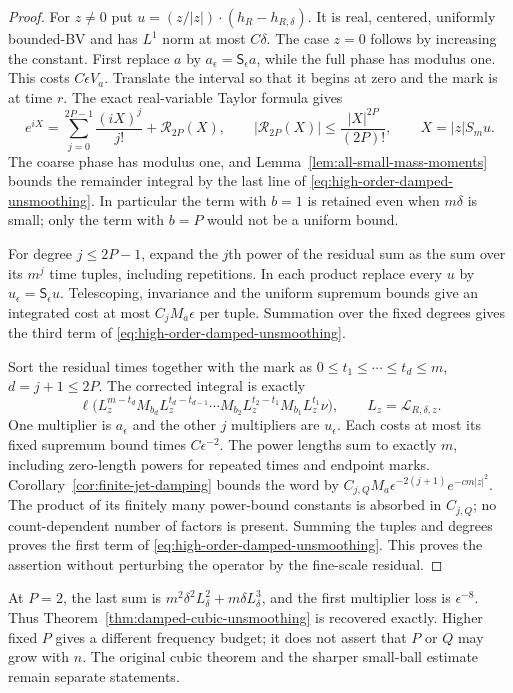 \begin{proof}
For $z\ne0$ put $u=(z/|z|)\cdot(h_R-h_{R,\delta})$. It is real,
centered, uniformly bounded-BV and has $L^1$ norm at most $C\delta$.
The case $z=0$ follows by increasing the constant. First replace
$a$ by $a_\epsilon=\mathsf S_\epsilon a$, while the full phase has
modulus one. This costs $C\epsilon V_a$. Translate the interval so
that it begins at zero and the mark is at time $r$. The exact
real-variable Taylor formula gives
\[
 e^{iX}=\sum_{j=0}^{2P-1}\frac{(iX)^j}{j!}+\mathcal R_{2P}(X),
 \qquad |\mathcal R_{2P}(X)|\le\frac{|X|^{2P}}{(2P)!},
 \qquad X=|z|S_m u.
\]
The coarse phase has modulus one, and
Lemma~\ref{lem:all-small-mass-moments} bounds the remainder integral
by the last line of \eqref{eq:high-order-damped-unsmoothing}.
In particular the term with $b=1$ is retained even when $m\delta$
is small; only the term with $b=P$ would not be a uniform bound.

For degree $j\le2P-1$, expand the $j$th power of the residual sum
as the sum over its $m^j$ time tuples, including repetitions. In each
product replace every $u$ by $u_\epsilon=\mathsf S_\epsilon u$.
Telescoping, invariance and the uniform supremum bounds give an
integrated cost at most $C_jM_a\epsilon$ per tuple. Summation over
the fixed degrees gives the third term of
\eqref{eq:high-order-damped-unsmoothing}.

Sort the residual times together with the mark as
$0\le t_1\le\cdots\le t_d\le m$, $d=j+1\le2P$. The corrected
integral is exactly
\[
 \ell\bigl(L_z^{m-t_d}M_{b_d}L_z^{t_d-t_{d-1}}
  \cdots M_{b_2}L_z^{t_2-t_1}M_{b_1}L_z^{t_1}\nu\bigr),
 \qquad L_z=\mathcal L_{R,\delta,z}.
\]
One multiplier is $a_\epsilon$ and the other $j$ multipliers are
$u_\epsilon$. Each costs at most its fixed supremum bound times
$C\epsilon^{-2}$. The power lengths sum to exactly $m$, including
zero-length powers for repeated times and endpoint marks.
Corollary~\ref{cor:finite-jet-damping} bounds the word by
$C_{j,Q}M_a\epsilon^{-2(j+1)}e^{-cm|z|^2}$. The product of its
finitely many power-bound constants is absorbed in $C_{j,Q}$;
no count-dependent number of factors is present. Summing the tuples
and degrees proves the first term of
\eqref{eq:high-order-damped-unsmoothing}. This proves the assertion
without perturbing the operator by the fine-scale residual.
\end{proof}

\begin{remark}
At $P=2$, the last sum is
$m^2\delta^2L_\delta^2+m\delta L_\delta^3$, and the first
multiplier loss is $\epsilon^{-8}$. Thus
Theorem~\ref{thm:damped-cubic-unsmoothing} is recovered exactly.
Higher fixed $P$ gives a different frequency budget; it does not
assert that $P$ or $Q$ may grow with $n$. The original cubic theorem
and the sharper small-ball estimate remain separate statements.
\end{remark}
